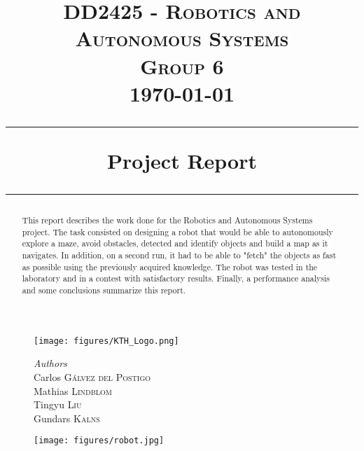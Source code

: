 \begin{titlepage}
\date{}
\begin{figure}
\centering
\texttt{[image: figures/KTH\_Logo.png]}
\end{figure}
\title{
\vspace{-1cm}
\textsc{DD2425 - Robotics and Autonomous Systems}
\\
\vspace{0.5cm}
\textsc{Group 6}\\
{\large \today}
\begin{center}
\rule{\linewidth}{0.5mm}
\textbf{Project Report}
\rule{\linewidth}{0.5mm}
\end{center}
}
\maketitle
\vspace{-2cm}
\begin{figure}[h]
\centering
\begin{minipage}[b]{0.3\linewidth}
                \begin{flushleft}
\normalsize{
\emph{Authors}\\
\vspace{0.5cm}
Carlos \textsc{Gálvez del Postigo} \\
Mathias \textsc{Lindblom} \\
Tingyu \textsc{Liu} \\
Gundars \textsc{Kalns}
}
\end{flushleft}
\end{minipage}
\qquad
\quad
\begin{minipage}[b]{0.62\linewidth}
                \texttt{[image: figures/robot.jpg]}
\end{minipage}
\end{figure}
\vspace{1cm}
\thispagestyle{empty}
\begin{abstract}
This report describes the work done for the Robotics and Autonomous Systems project. The task consisted on designing a robot that would be able to autonomously explore a maze, avoid obstacles, detected and identify objects and build a map as it navigates. In addition, on a second run, it had to be able to "fetch" the objects as fast as possible using the previously acquired knowledge. The robot was tested in the laboratory and in a contest with satisfactory results. Finally, a performance analysis and some conclusions summarize this report. 
\end{abstract}
\end{titlepage}